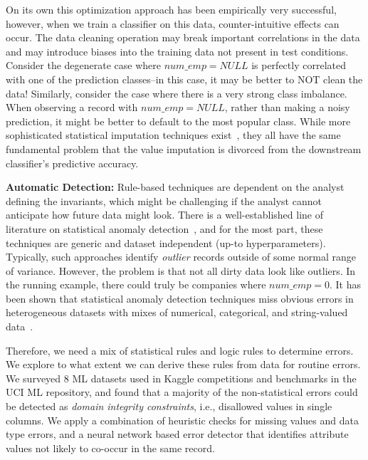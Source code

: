 On its own this optimization approach has been empirically very successful, however, when we train a classifier on this data, counter-intuitive effects can occur.  
The data cleaning operation may break important correlations in the data and may introduce biases into the training data not present in test conditions. 
Consider the degenerate case where $num\_emp = NULL$ is perfectly correlated with one of the prediction classes--in this case, it may be better to NOT clean the data!
Similarly, consider the case where there is a very strong class imbalance.
When observing a record with $num\_emp = NULL$, rather than making a noisy prediction, it might be better to default to the most popular class. 
While more sophisticated statistical imputation techniques exist~\cite{schafer1998multiple}, they all have the same fundamental problem that the value imputation is divorced from the downstream classifier's predictive accuracy.

\vspace{0.5em}\noindent\textbf{Automatic Detection: } Rule-based techniques are dependent on the analyst defining the invariants, which might be challenging if the analyst cannot anticipate how future data might look.
There is a well-established line of literature on statistical anomaly detection~\cite{hellerstein2008quantitative}, and for the most part, these techniques are generic and dataset independent (up-to hyperparameters). Typically, such approaches identify \emph{outlier} records outside of some normal range of variance. However, the problem is that not all dirty data look like outliers. In the running example, there could truly be companies where $num\_emp = 0$. It has been shown that statistical anomaly detection techniques miss obvious errors in heterogeneous datasets with mixes of numerical, categorical, and string-valued data~\cite{DBLP:journals/pvldb/AbedjanCDFIOPST16}.

Therefore, we need a mix of statistical rules and logic rules to determine errors.
We explore to what extent we can derive these rules from data for routine errors. 
We surveyed 8 ML datasets used in Kaggle competitions and benchmarks in the UCI ML repository, and found that a majority of the non-statistical errors could be detected as \emph{domain integrity constraints}, i.e., disallowed values in single columns.
We apply a combination of heuristic checks for missing values and data type errors, and a neural network based error detector that identifies attribute values not likely to co-occur in the same record.

